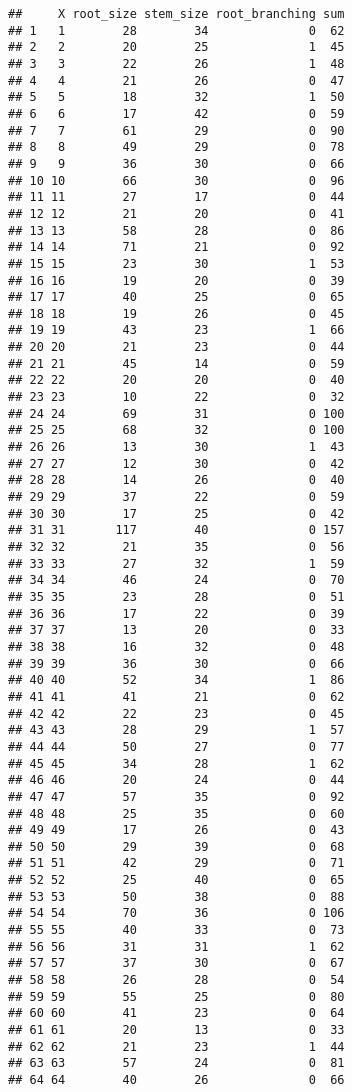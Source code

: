 \documentclass[
]{article}
\begin{document}
\begin{verbatim}
##     X root_size stem_size root_branching sum
## 1   1        28        34              0  62
## 2   2        20        25              1  45
## 3   3        22        26              1  48
## 4   4        21        26              0  47
## 5   5        18        32              1  50
## 6   6        17        42              0  59
## 7   7        61        29              0  90
## 8   8        49        29              0  78
## 9   9        36        30              0  66
## 10 10        66        30              0  96
## 11 11        27        17              0  44
## 12 12        21        20              0  41
## 13 13        58        28              0  86
## 14 14        71        21              0  92
## 15 15        23        30              1  53
## 16 16        19        20              0  39
## 17 17        40        25              0  65
## 18 18        19        26              0  45
## 19 19        43        23              1  66
## 20 20        21        23              0  44
## 21 21        45        14              0  59
## 22 22        20        20              0  40
## 23 23        10        22              0  32
## 24 24        69        31              0 100
## 25 25        68        32              0 100
## 26 26        13        30              1  43
## 27 27        12        30              0  42
## 28 28        14        26              0  40
## 29 29        37        22              0  59
## 30 30        17        25              0  42
## 31 31       117        40              0 157
## 32 32        21        35              0  56
## 33 33        27        32              1  59
## 34 34        46        24              0  70
## 35 35        23        28              0  51
## 36 36        17        22              0  39
## 37 37        13        20              0  33
## 38 38        16        32              0  48
## 39 39        36        30              0  66
## 40 40        52        34              1  86
## 41 41        41        21              0  62
## 42 42        22        23              0  45
## 43 43        28        29              1  57
## 44 44        50        27              0  77
## 45 45        34        28              1  62
## 46 46        20        24              0  44
## 47 47        57        35              0  92
## 48 48        25        35              0  60
## 49 49        17        26              0  43
## 50 50        29        39              0  68
## 51 51        42        29              0  71
## 52 52        25        40              0  65
## 53 53        50        38              0  88
## 54 54        70        36              0 106
## 55 55        40        33              0  73
## 56 56        31        31              1  62
## 57 57        37        30              0  67
## 58 58        26        28              0  54
## 59 59        55        25              0  80
## 60 60        41        23              0  64
## 61 61        20        13              0  33
## 62 62        21        23              1  44
## 63 63        57        24              0  81
## 64 64        40        26              0  66
\end{verbatim}
\end{document}
